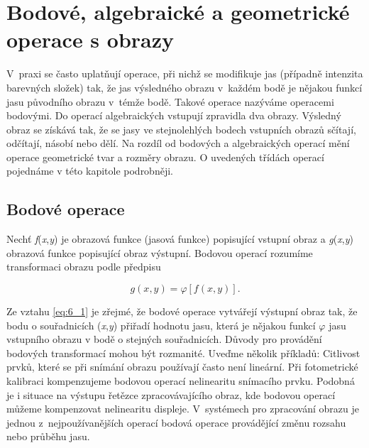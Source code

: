\chapter*{Bodové, algebraické a geometrické operace s obrazy}

V~praxi se často uplatňují operace, při nichž se modifikuje jas (případně intenzita barevných složek) tak, že jas výsledného obrazu v~každém bodě je nějakou funkcí jasu původního obrazu v~témže bodě. Takové operace nazýváme operacemi bodovými. Do operací algebraických vstupují zpravidla dva obrazy. Výsledný obraz se získává tak, že se jasy ve stejnolehlých bodech vstupních obrazů sčítají, odčítají, násobí nebo dělí. Na rozdíl od bodových a algebraických operací mění operace geometrické tvar a rozměry obrazu. O uvedených třídách operací pojednáme v této kapitole podrobněji. 

\section*{Bodové operace}

Nechť \textit{f}(\textit{x},\textit{y}) je obrazová funkce (jasová funkce) popisující vstupní obraz a \textit{g}(\textit{x},\textit{y}) obrazová funkce popisující obraz výstupní. Bodovou operací rozumíme transformaci obrazu podle předpisu

\begin{equation} \label{eq:6_1}
    g(x, y) = \varphi \left[ f \left( x, y \right) \right].
\end{equation}

Ze vztahu \eqref{eq:6_1} je zřejmé, že bodové operace vytvářejí výstupní obraz tak, že bodu o souřadnicích (\textit{x},\textit{y}) přiřadí hodnotu jasu, která je nějakou funkcí $\varphi$ jasu vstupního obrazu v bodě o stejných souřadnicích. Důvody pro provádění bodových transformací mohou být rozmanité. Uveďme několik příkladů: Citlivost prvků, které se při snímání obrazu používají často není lineární. Při fotometrické kalibraci kompenzujeme  bodovou operací nelinearitu snímacího prvku. Podobná je i situace na výstupu řetězce zpracovávajícího obraz, kde bodovou operací můžeme kompenzovat nelinearitu displeje. V~systémech pro zpracování obrazu je jednou z~nejpoužívanějších operací bodová operace provádějící změnu rozsahu nebo průběhu jasu.

